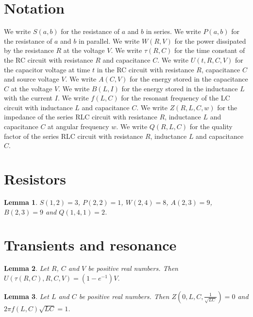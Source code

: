 \documentclass{article}
\newtheorem{lemma}{Lemma}
\begin{document}
\section{Notation}

We write $S(a,b)$ for the resistance of $a$ and $b$ in series.
We write $P(a,b)$ for the resistance of $a$ and $b$ in parallel.
We write $W(R,V)$ for the power dissipated by the resistance $R$ at the voltage $V$.
We write $\tau(R,C)$ for the time constant of the RC circuit with resistance $R$ and capacitance $C$.
We write $U(t,R,C,V)$ for the capacitor voltage at time $t$ in the RC circuit with resistance $R$, capacitance $C$ and source voltage $V$.
We write $A(C,V)$ for the energy stored in the capacitance $C$ at the voltage $V$.
We write $B(L,I)$ for the energy stored in the inductance $L$ with the current $I$.
We write $f(L,C)$ for the resonant frequency of the LC circuit with inductance $L$ and capacitance $C$.
We write $Z(R,L,C,w)$ for the impedance of the series RLC circuit with resistance $R$, inductance $L$ and capacitance $C$ at angular frequency $w$.
We write $Q(R,L,C)$ for the quality factor of the series RLC circuit with resistance $R$, inductance $L$ and capacitance $C$.

\section{Resistors}

\begin{lemma}\label{values}
$S(1,2)=3$, $P(2,2)=1$, $W(2,4)=8$, $A(2,3)=9$, $B(2,3)=9$ and $Q(1,4,1)=2$.
\end{lemma}

\section{Transients and resonance}

\begin{lemma}\label{charging}
Let $R$, $C$ and $V$ be positive real numbers. Then $U(\tau(R,C),R,C,V)=(1-e^{-1})V$.
\end{lemma}

\begin{lemma}\label{resonance}
Let $L$ and $C$ be positive real numbers. Then $Z(0,L,C,\frac{1}{\sqrt{LC}})=0$ and $2\pi f(L,C)\sqrt{LC}=1$.
\end{lemma}
\end{document}
